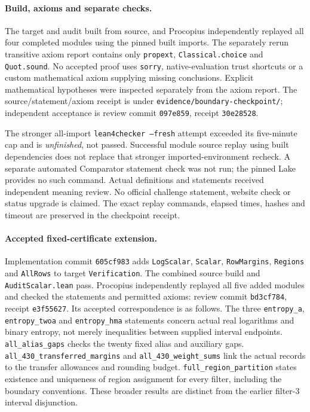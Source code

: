 \paragraph{Build, axioms and separate checks.}
The target and audit built from source, and Procopius independently
replayed all four completed modules using the pinned built imports.
The separately rerun transitive axiom report contains only
\texttt{propext}, \texttt{Classical.choice} and \texttt{Quot.sound}.
No accepted proof uses \texttt{sorry}, native-evaluation trust shortcuts
or a custom mathematical axiom supplying missing conclusions.
Explicit mathematical hypotheses were inspected separately from the
axiom report. The source/statement/axiom receipt is under
\texttt{evidence/boundary-checkpoint/}; independent acceptance is
review commit \texttt{097e859}, receipt \texttt{30e28528}.

The stronger all-import \texttt{lean4checker --fresh} attempt exceeded
its five-minute cap and is \emph{unfinished}, not passed. Successful
module source replay using built dependencies does not replace that
stronger imported-environment recheck. A separate automated Comparator
statement check was not run; the pinned Lake provides no such command.
Actual definitions and statements received independent meaning review.
No official challenge statement, website check or status upgrade is
claimed. The exact replay commands, elapsed times, hashes and timeout
are preserved in the checkpoint receipt.

\paragraph{Accepted fixed-certificate extension.}
Implementation commit \texttt{605cf983} adds \texttt{LogScalar},
\texttt{Scalar}, \texttt{RowMargins}, \texttt{Regions} and
\texttt{AllRows} to target \texttt{Verification}.
The combined source build and \texttt{AuditScalar.lean} pass.
Procopius independently replayed all five added modules and checked
the statements and permitted axioms: review commit \texttt{bd3cf784},
receipt \texttt{e3f55627}. Its accepted correspondence is as follows. The three
\nolinkurl{entropy_a}, \nolinkurl{entropy_twoa} and
\nolinkurl{entropy_hma} statements concern actual real logarithms
and binary entropy, not merely inequalities between supplied interval
endpoints. \nolinkurl{all_alias_gaps} checks the twenty fixed
alias and auxiliary gaps. \nolinkurl{all_430_transferred_margins} and
\nolinkurl{all_430_weight_sums} link the actual records to the
transfer allowances and rounding budget.
\nolinkurl{full_region_partition} states existence and uniqueness of
region assignment for every filter, including the boundary conventions.
These broader results are distinct from the earlier filter-3
interval disjunction.

